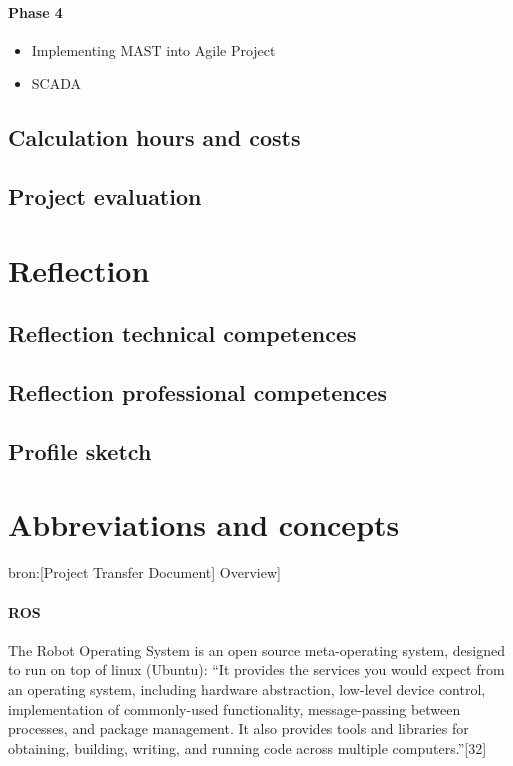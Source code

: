 \documentclass[12pt,a4paper]{report}
\begin{document}
\subsubsection{Phase 4}
\begin{itemize}
\item Implementing MAST into Agile Project
\item SCADA
\end{itemize}

\section{Calculation hours and costs}

\newpage
\section{Project evaluation}

\chapter{Reflection}
\section{Reflection technical competences}

\newpage
\section{Reflection professional competences}

\newpage
\section{Profile sketch}

\chapter{Abbreviations and concepts}
bron:[Project Transfer Document] Overview]
\subsubsection{ROS}
The Robot Operating System is an open source meta-operating system, designed to run on top of linux (Ubuntu): “It provides the services you would expect from an operating system, including hardware abstraction, low-level device control, implementation of commonly-used functionality, message-passing between processes, and package management. It also provides tools and libraries for obtaining, building, writing, and running code across multiple computers.”[32]
\end{document}
